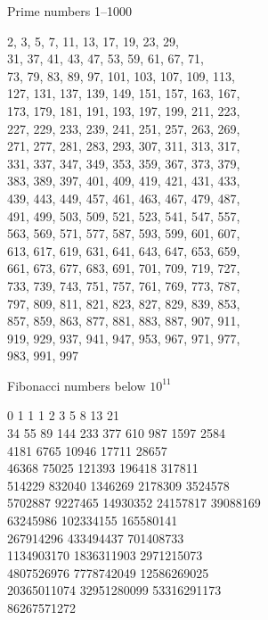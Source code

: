 \documentclass[a4paper,twocolumn]{article}
\begin{document}
\begingroup
\centering\Huge{Prime numbers 1--1000}
\vspace{20pt}

\normalsize
2, 3, 5, 7, 11, 13, 17, 19, 23, 29, \\
31, 37, 41, 43, 47, 53, 59, 61, 67, 71, \\
73, 79, 83, 89, 97, 101, 103, 107, 109, 113, \\
127, 131, 137, 139, 149, 151, 157, 163, 167, \\
173, 179, 181, 191, 193, 197, 199, 211, 223, \\
227, 229, 233, 239, 241, 251, 257, 263, 269, \\
271, 277, 281, 283, 293, 307, 311, 313, 317, \\
331, 337, 347, 349, 353, 359, 367, 373, 379, \\
383, 389, 397, 401, 409, 419, 421, 431, 433, \\
439, 443, 449, 457, 461, 463, 467, 479, 487, \\
491, 499, 503, 509, 521, 523, 541, 547, 557, \\
563, 569, 571, 577, 587, 593, 599, 601, 607, \\
613, 617, 619, 631, 641, 643, 647, 653, 659,  \\
661, 673, 677, 683, 691, 701, 709, 719, 727,  \\
733, 739, 743, 751, 757, 761, 769, 773, 787,  \\
797, 809, 811, 821, 823, 827, 829, 839, 853,  \\
857, 859, 863, 877, 881, 883, 887, 907, 911,  \\
919, 929, 937, 941, 947, 953, 967, 971, 977,  \\
983, 991, 997 

\centering\Huge{Fibonacci numbers below $10^{11}$}
\vspace{20pt}

\normalsize
0 1 1 1 2 3 5 8 13 21 \\
34 55 89 144 233 377 610 987 1597 2584 \\
4181 6765 10946 17711 28657 \\
46368 75025 121393 196418 317811 \\
514229 832040 1346269 2178309 3524578 \\
5702887 9227465 14930352 24157817 39088169 \\
63245986 102334155 165580141 \\
267914296 433494437 701408733 \\
1134903170 1836311903 2971215073 \\
4807526976 7778742049 12586269025 \\
20365011074 32951280099 53316291173 \\
86267571272
\end{document}
